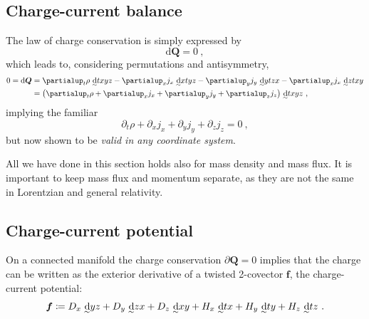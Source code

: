 \documentclass[\ifafour a4paper,12pt,\else a5paper,10pt,\fi%
onecolumn,oneside,article,%
british%
]{memoir}
\theoremstyle{remark}
\theoremstyle{innote}
\newcommand*{\de}{\partialup}%
\newcommand*{\di}{\mathrm{d}}%
\newcommand*{\defd}{\coloneqq}
\renewcommand*{\|}[1][]{\nonscript\:#1\vert\nonscript\:\mathopen{}}
\newcommand*{\eqn}{eq.}%
\newcommand*{\tw}[2][\scriptstyle\sim]{\smash[b]{\underset{\mathclap{{}^{#1}}}{#2}}}
\newcommand*{\ti}[1][\scriptstyle\sim]{\tw[#1]{\di}}
\begin{document}
\subsection{Charge-current balance}
\label{sec:charge_balance}

The law of charge conservation is simply expressed by
\begin{equation}
  \label{eq:charge_conservation}
  \di\bm{Q} = 0 \ ,
\end{equation}
which leads to, considering permutations and antisymmetry,
\begin{equation}
  \label{eq:charge_cons_calculated}
  \begin{split}
0=\di\bm{Q} &= \de_{t}\rho\ \ti txyz 
  -\de_{x}j_{x}\ \ti xtyz
  -\de_{y}j_{y}\ \ti ytzx
  -\de_{x}j_{x}\ \ti ztxy
  \\
  &=\bigl(\de_{t}\rho + \de_{x}j_{x} + \de_{y}j_{y} + \de_{z}j_{z} \bigr)\
  \ti txyz \ ,
\end{split}
\end{equation}
implying the familiar \autocites[\eqn~(1.14)]{kovetz2000}
\begin{equation}
  \label{eq:familiar_charge_cons}
  \de_{t}\rho + \de_{x}j_{x} + \de_{y}j_{y} + \de_{z}j_{z} = 0 \ ,
\end{equation}
but now shown to be \emph{valid in any coordinate system}.

All we have done in this section holds also for mass density and mass flux. It is important to keep mass flux and momentum separate, as they are not the same in Lorentzian and general relativity.

\subsection{Charge-current potential}
\label{sec:charge_potential}

On a connected manifold the charge conservation $\de\bm{Q}=0$ implies that the charge can be written as the exterior derivative of a twisted 2-covector $\bm{f}$, the charge-current potential:
\begin{equation}
  \label{eq:charge_pot_coords}
    \bm{f} \defd
    D_{x}\ \ti yz + D_{y}\ \ti zx + D_{z}\ \ti xy
  + H_{x}\ \ti tx + H_{y}\ \ti ty + H_{z}\ \ti tz \ .
\end{equation}
\end{document}

